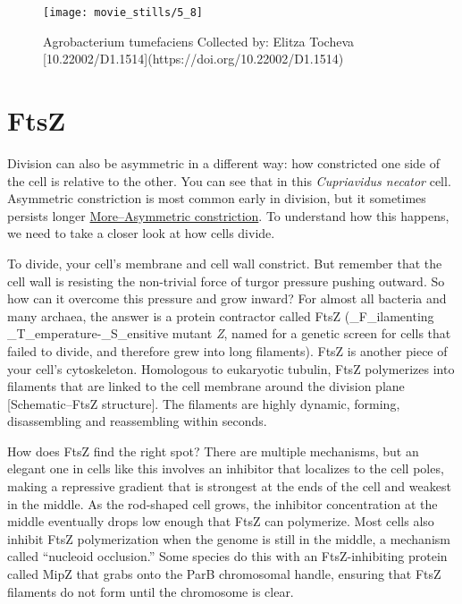 \documentclass[]{tufte-book}
\begin{document}
\begin{figure}
\texttt{[image: movie\_stills/5\_8]} \caption[Agrobacterium tumefaciens Collected by]{Agrobacterium tumefaciens Collected by: Elitza Tocheva [10.22002/D1.1514](https://doi.org/10.22002/D1.1514)}\label{fig:unnamed-chunk-92}
\end{figure}

\section{FtsZ}\label{ftsz}

Division can also be asymmetric in a different way: how constricted one
side of the cell is relative to the other. You can see that in this
\emph{Cupriavidus necator} cell. Asymmetric constriction is most common
early in division, but it sometimes persists longer
\protect\hyperlink{moreasymmetric-constriction}{More--Asymmetric
constriction}. To understand how this happens, we need to take a closer
look at how cells divide.

To divide, your cell's membrane and cell wall constrict. But remember
that the cell wall is resisting the non-trivial force of turgor pressure
pushing outward. So how can it overcome this pressure and grow inward?
For almost all bacteria and many archaea, the answer is a protein
contractor called FtsZ (\_F\_ilamenting \_T\_emperature-\_S\_ensitive
mutant \emph{Z}, named for a genetic screen for cells that failed to
divide, and therefore grew into long filaments). FtsZ is another piece
of your cell's cytoskeleton. Homologous to eukaryotic tubulin, FtsZ
polymerizes into filaments that are linked to the cell membrane around
the division plane {[}Schematic--FtsZ structure{]}. The filaments are
highly dynamic, forming, disassembling and reassembling within seconds.

How does FtsZ find the right spot? There are multiple mechanisms, but an
elegant one in cells like this involves an inhibitor that localizes to
the cell poles, making a repressive gradient that is strongest at the
ends of the cell and weakest in the middle. As the rod-shaped cell
grows, the inhibitor concentration at the middle eventually drops low
enough that FtsZ can polymerize. Most cells also inhibit FtsZ
polymerization when the genome is still in the middle, a mechanism
called ``nucleoid occlusion.'' Some species do this with an
FtsZ-inhibiting protein called MipZ that grabs onto the ParB chromosomal
handle, ensuring that FtsZ filaments do not form until the chromosome is
clear.
\end{document}
